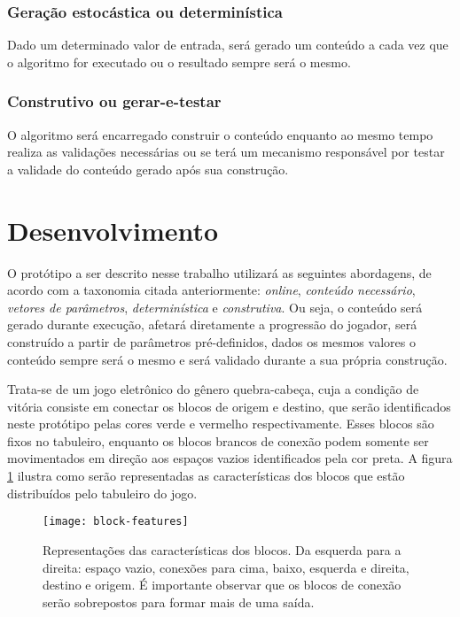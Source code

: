 \documentclass[10pt, conference, compsocconf]{IEEEtran}
\begin{document}
\subsubsection{Geração estocástica ou determinística}

Dado um determinado valor de entrada, será gerado um conteúdo a cada vez que o algoritmo for executado ou o resultado sempre será o mesmo.

\subsubsection{Construtivo ou gerar-e-testar}

O algoritmo será encarregado construir o conteúdo enquanto ao mesmo tempo realiza as validações necessárias ou se terá um mecanismo responsável por testar a validade do conteúdo gerado após sua construção.

\section{Desenvolvimento}
\label{sec:development}

O protótipo a ser descrito nesse trabalho utilizará as seguintes abordagens, de acordo com a taxonomia citada anteriormente: \textit{online}, \textit{conteúdo necessário}, \textit{vetores de parâmetros}, \textit{determinística} e \textit{construtiva}. Ou seja, o conteúdo será gerado durante execução, afetará diretamente a progressão do jogador, será construído a partir de parâmetros pré-definidos, dados os mesmos valores o conteúdo sempre será o mesmo e será validado durante a sua própria construção.

Trata-se de um jogo eletrônico do gênero quebra-cabeça, cuja a condição de vitória consiste em conectar os blocos de origem e destino, que serão identificados neste protótipo pelas cores verde e vermelho respectivamente. Esses blocos são fixos no tabuleiro, enquanto os blocos brancos de conexão podem somente ser movimentados em direção aos espaços vazios identificados pela cor preta. A figura \ref{fig:block-features} ilustra como serão representadas as características dos blocos que estão distribuídos pelo tabuleiro do jogo.

\begin{figure}[h]
    \centering
    \texttt{[image: block-features]}
    \caption{Representações das características dos blocos. Da esquerda para a direita: espaço vazio, conexões para cima, baixo, esquerda e direita, destino e origem. É importante observar que os blocos de conexão serão sobrepostos para formar mais de uma saída.}
    \label{fig:block-features}
\end{figure}
\end{document}
